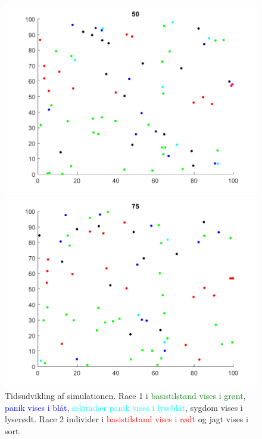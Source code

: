 \documentclass[a4paper,10pt]{article} 	%
\numberwithin{equation}{section}
\begin{document}
\begin{figure}[H]
		\begin{minipage}{0.45\textwidth}
			\centering
			\includegraphics[width=\textwidth]{img/plot3.png}
		\end{minipage}
		\begin{minipage}{0.45\textwidth}
			\centering
			\includegraphics[width=\textwidth]{img/plot4.png}
		\end{minipage}
	\caption{Tidsudvikling af simulationen. Race 1 i \textcolor{green}{basistilstand vises i grønt}, \textcolor{blue}{panik vises i blåt}, \textcolor{cyan}{sekundær panik vises i lyseblåt}, \textcolor{VioletRed}{sygdom vises i lyserødt}. Race 2 individer i \textcolor{red}{basistilstand vises i rødt} og jagt vises i sort.}
	\end{figure}
\end{document}

